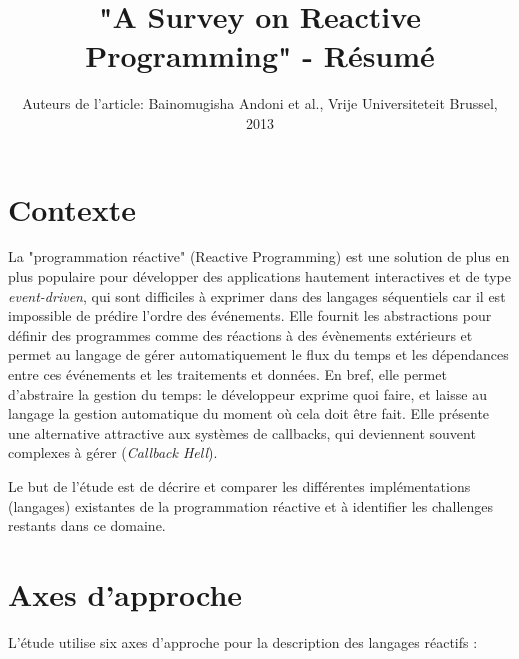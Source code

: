 \documentclass[10pt,final]{IEEEtran}
\begin{document}

\title{"A Survey on Reactive Programming" - Résumé}

\author{Auteurs de l'article: Bainomugisha Andoni et al., Vrije Universiteteit Brussel, 2013\vspace{-4ex}}

\maketitle

\section{Contexte}

La "programmation réactive" (Reactive Programming) est une solution de plus en plus populaire pour développer des applications hautement interactives et de type \textit{event-driven}, qui sont difficiles à exprimer dans des langages séquentiels car il est impossible de prédire l'ordre des événements. Elle fournit les abstractions pour définir des programmes comme des réactions à des évènements extérieurs et permet au langage de gérer automatiquement le flux du temps et les dépendances entre ces événements et les traitements et données. En bref, elle permet d'abstraire la gestion du temps: le développeur exprime quoi faire, et laisse au langage la gestion automatique du moment où cela doit être fait. Elle présente une alternative attractive aux systèmes de callbacks, qui deviennent souvent complexes à gérer (\textit{Callback Hell}).

Le but de l'étude est de décrire et comparer les différentes implémentations (langages) existantes de la programmation réactive et à identifier les challenges restants dans ce domaine.

\section{Axes d'approche}
L'étude utilise six axes d'approche pour la description des langages réactifs :
\end{document}
